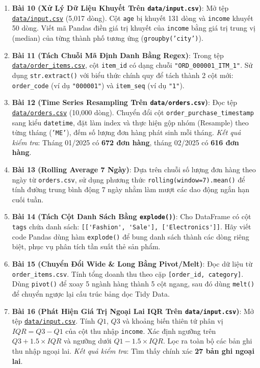 \begin{baitapbox}
\begin{enumerate}
    \item \textbf{Bài 10 (Xử Lý Dữ Liệu Khuyết Trên \texttt{data/input.csv})}: Mở tệp \href{run:./data/input.csv}{\texttt{data/input.csv}} (5,017 dòng). Cột \texttt{age} bị khuyết 131 dòng và \texttt{income} khuyết 50 dòng. Viết mã Pandas điền giá trị khuyết của \texttt{income} bằng giá trị trung vị (median) của từng thành phố tương ứng (\texttt{groupby('city')}).
    \item \textbf{Bài 11 (Tách Chuỗi Mã Định Danh Bằng Regex)}: Trong tệp \href{run:./data/order_items.csv}{\texttt{data/order\_items.csv}}, cột \texttt{item\_id} có dạng chuỗi \texttt{"ORD\_000001\_ITM\_1"}. Sử dụng \lstinline|str.extract()| với biểu thức chính quy để tách thành 2 cột mới: \texttt{order\_code} (ví dụ \texttt{"000001"}) và \texttt{item\_seq} (ví dụ \texttt{"1"}).
    \item \textbf{Bài 12 (Time Series Resampling Trên \texttt{data/orders.csv})}: Đọc tệp \href{run:./data/orders.csv}{\texttt{data/orders.csv}} (10,000 dòng). Chuyển đổi cột \texttt{order\_purchase\_timestamp} sang kiểu \texttt{datetime}, đặt làm index và thực hiện gộp nhóm (Resample) theo từng tháng (\texttt{'ME'}), đếm số lượng đơn hàng phát sinh mỗi tháng. \textit{Kết quả kiểm tra}: Tháng 01/2025 có \textbf{672 đơn hàng}, tháng 02/2025 có \textbf{616 đơn hàng}.
    \item \textbf{Bài 13 (Rolling Average 7 Ngày)}: Dựa trên chuỗi số lượng đơn hàng theo ngày từ \texttt{orders.csv}, sử dụng phương thức \lstinline|rolling(window=7).mean()| để tính đường trung bình động 7 ngày nhằm làm mượt các dao động ngắn hạn cuối tuần.
    \item \textbf{Bài 14 (Tách Cột Danh Sách Bằng \texttt{explode()})}: Cho DataFrame có cột \texttt{tags} chứa danh sách: \lstinline|[['Fashion', 'Sale'], ['Electronics']]|. Hãy viết code Pandas dùng hàm \texttt{explode()} để bung danh sách thành các dòng riêng biệt, phục vụ phân tích tần suất thẻ sản phẩm.
    \item \textbf{Bài 15 (Chuyển Đổi Wide \& Long Bằng Pivot/Melt)}: Đọc dữ liệu từ \texttt{order\_items.csv}. Tính tổng doanh thu theo cặp \texttt{[order\_id, category]}. Dùng \texttt{pivot()} để xoay 5 ngành hàng thành 5 cột ngang, sau đó dùng \texttt{melt()} để chuyển ngược lại cấu trúc bảng dọc Tidy Data.
    \item \textbf{Bài 16 (Phát Hiện Giá Trị Ngoại Lai IQR Trên \texttt{data/input.csv})}: Mở tệp \href{run:./data/input.csv}{\texttt{data/input.csv}}. Tính $Q1$, $Q3$ và khoảng biến thiên tứ phân vị $IQR = Q3 - Q1$ của cột thu nhập \texttt{income}. Xác định ngưỡng trên $Q3 + 1.5 \times IQR$ và ngưỡng dưới $Q1 - 1.5 \times IQR$. Lọc ra toàn bộ các bản ghi thu nhập ngoại lai. \textit{Kết quả kiểm tra}: Tìm thấy chính xác \textbf{27 bản ghi ngoại lai}.

\end{enumerate}
\end{baitapbox}
